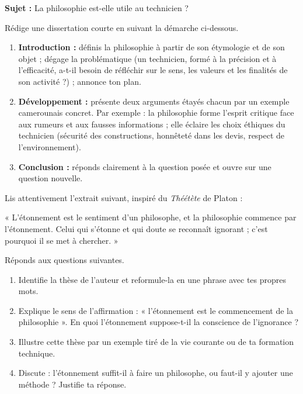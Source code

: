 \documentclass[11pt]{article}
\newcounter{popsec}
\newcounter{popsub}
\newcommand{\courssub}[1]{%
  \stepcounter{popsub}%
  \par\vspace{9pt}\noindent{\popxbold\fontsize{11.5}{13}\selectfont\color{popink}{\color{poporange}\thepopsec.\thepopsub}\hspace{6pt}#1}\par\nopagebreak\vspace{4pt}
}
\begin{document}
\courssub{Je me prépare au Bac}

\begin{exercice}
\textbf{Sujet :} La philosophie est-elle utile au technicien ?

Rédige une dissertation courte en suivant la démarche ci-dessous.
\begin{enumerate}
\item \textbf{Introduction :} définis la philosophie à partir de son étymologie et de son objet ; dégage la problématique (un technicien, formé à la précision et à l'efficacité, a-t-il besoin de réfléchir sur le sens, les valeurs et les finalités de son activité ?) ; annonce ton plan.
\item \textbf{Développement :} présente deux arguments étayés chacun par un exemple camerounais concret. Par exemple : la philosophie forme l'esprit critique face aux rumeurs et aux fausses informations ; elle éclaire les choix éthiques du technicien (sécurité des constructions, honnêteté dans les devis, respect de l'environnement).
\item \textbf{Conclusion :} réponds clairement à la question posée et ouvre sur une question nouvelle.
\end{enumerate}
\end{exercice}

\begin{exercice}
Lis attentivement l'extrait suivant, inspiré du \emph{Théétète} de Platon :

« L'étonnement est le sentiment d'un philosophe, et la philosophie commence par l'étonnement. Celui qui s'étonne et qui doute se reconnaît ignorant ; c'est pourquoi il se met à chercher. »

Réponds aux questions suivantes.
\begin{enumerate}
\item Identifie la thèse de l'auteur et reformule-la en une phrase avec tes propres mots.
\item Explique le sens de l'affirmation : « l'étonnement est le commencement de la philosophie ». En quoi l'étonnement suppose-t-il la conscience de l'ignorance ?
\item Illustre cette thèse par un exemple tiré de la vie courante ou de ta formation technique.
\item Discute : l'étonnement suffit-il à faire un philosophe, ou faut-il y ajouter une méthode ? Justifie ta réponse.
\end{enumerate}
\end{exercice}
\end{document}
